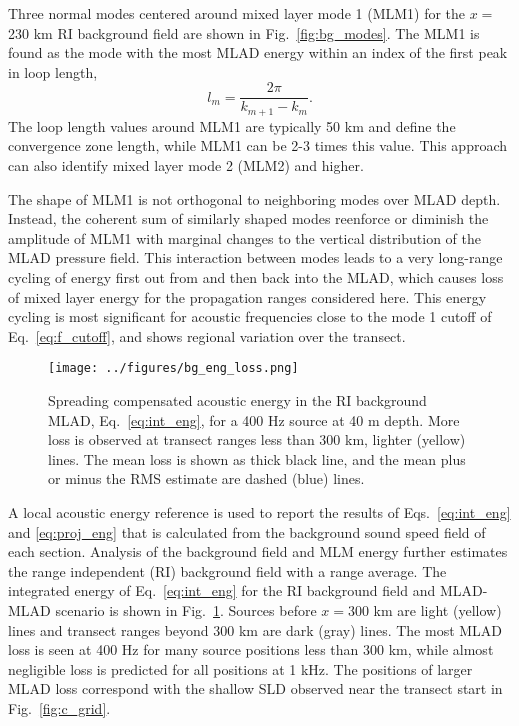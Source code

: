 \documentclass[preprint,NumberedRefs]{JASA}
\begin{document}
Three normal modes centered around mixed layer mode 1 (MLM1) for the $x=$230 km RI background field are shown in Fig.~\ref{fig:bg_modes}. The MLM1 is found as the mode with the most MLAD energy within an index of the first peak in loop length\citep{jensen2011computational},
\begin{equation}
    l_{m} = \frac{2 \pi}{k_{m+1} - k_m}.
    \label{eq:loop_length}
\end{equation}
The loop length values around MLM1 are typically 50 km and define the convergence zone length, while MLM1 can be 2-3 times this value. This approach can also identify mixed layer mode 2 (MLM2) and higher.

The shape of MLM1 is not orthogonal to neighboring modes over MLAD depth. Instead, the coherent sum of similarly shaped modes reenforce or diminish the amplitude of MLM1 with marginal changes to the vertical distribution of the MLAD pressure field. This interaction between modes leads to a very long-range cycling of energy first out from and then back into the MLAD\citep{porter93,colosi2020observations}, which causes loss of mixed layer energy for the propagation ranges considered here. This energy cycling is most significant for acoustic frequencies close to the mode 1 cutoff of Eq.~\eqref{eq:f_cutoff}, and shows regional variation over the transect.

\begin{figure}
\texttt{[image: ../figures/bg\_eng\_loss.png]}
    \caption{Spreading compensated acoustic energy in the RI background MLAD, Eq.~\eqref{eq:int_eng}, for a 400 Hz source at 40 m depth. More loss is observed at transect ranges less than 300 km, lighter (yellow) lines. The mean loss is shown as thick black line, and the mean plus or minus the RMS estimate are dashed (blue) lines.}
    \label{fig:bg_eng}
\end{figure}
A local acoustic energy reference is used to report the results of Eqs.~\ref{eq:int_eng} and \ref{eq:proj_eng} that is calculated from the background sound speed field of each section. Analysis of the background field and MLM energy further estimates the range independent (RI) background field with a range average. The integrated energy of Eq.~\eqref{eq:int_eng} for the RI background field and MLAD-MLAD scenario is shown in Fig.~\ref{fig:bg_eng}. Sources before $x=$300 km are light (yellow) lines and transect ranges beyond 300 km are dark (gray) lines. The most MLAD loss is seen at 400 Hz for many source positions less than 300 km, while almost negligible loss is predicted for all positions at 1 kHz. The positions of larger MLAD loss correspond with the shallow SLD observed near the transect start in Fig.~\ref{fig:c_grid}.
\end{document}
